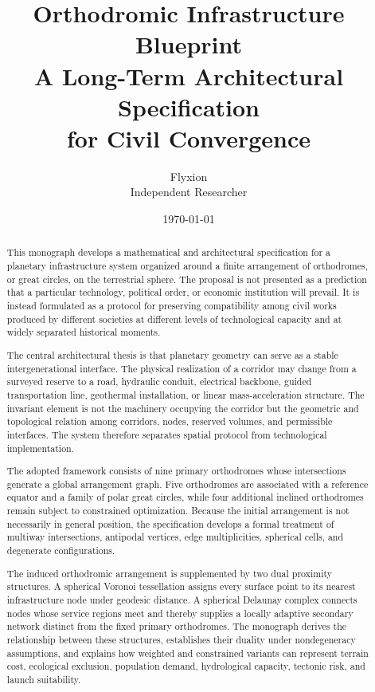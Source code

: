 \documentclass[11pt,fleqn]{book}
\title{
  \textbf{Orthodromic Infrastructure Blueprint}\\[0.5em]
  \Large A Long-Term Architectural Specification\\
  for Civil Convergence
}
\author{
  Flyxion\\
  \small Independent Researcher
}
\date{\today}
\numberwithin{equation}{chapter}
\theoremstyle{plain}
\theoremstyle{definition}
\theoremstyle{remark}
\begin{document}
\frontmatter

\maketitle

\begin{abstract}
\noindent
This monograph develops a mathematical and architectural specification for a planetary infrastructure system organized around a finite arrangement of orthodromes, or great circles, on the terrestrial sphere. The proposal is not presented as a prediction that a particular technology, political order, or economic institution will prevail. It is instead formulated as a protocol for preserving compatibility among civil works produced by different societies at different levels of technological capacity and at widely separated historical moments.

The central architectural thesis is that planetary geometry can serve as a stable intergenerational interface. The physical realization of a corridor may change from a surveyed reserve to a road, hydraulic conduit, electrical backbone, guided transportation line, geothermal installation, or linear mass-acceleration structure. The invariant element is not the machinery occupying the corridor but the geometric and topological relation among corridors, nodes, reserved volumes, and permissible interfaces. The system therefore separates spatial protocol from technological implementation.

The adopted framework consists of nine primary orthodromes whose intersections generate a global arrangement graph. Five orthodromes are associated with a reference equator and a family of polar great circles, while four additional inclined orthodromes remain subject to constrained optimization. Because the initial arrangement is not necessarily in general position, the specification develops a formal treatment of multiway intersections, antipodal vertices, edge multiplicities, spherical cells, and degenerate configurations.

The induced orthodromic arrangement is supplemented by two dual proximity structures. A spherical Voronoi tessellation assigns every surface point to its nearest infrastructure node under geodesic distance. A spherical Delaunay complex connects nodes whose service regions meet and thereby supplies a locally adaptive secondary network distinct from the fixed primary orthodromes. The monograph derives the relationship between these structures, establishes their duality under nondegeneracy assumptions, and explains how weighted and constrained variants can represent terrain cost, ecological exclusion, population demand, hydrological capacity, tectonic risk, and launch suitability.


\end{abstract}
\end{document}
